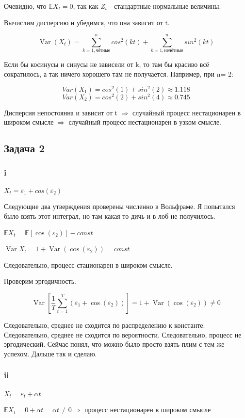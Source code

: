 \documentclass[a4paper,12pt]{article}
\def \e{\varepsilon}
\def \mbb{\mathbb}
\DeclareMathOperator{\Var}{Var}
\def \E{\mbb{E}}
\def \e{\varepsilon}
\begin{document}
Очевидно, что $  \E X_t = 0$, так как $ Z_t $ - стандартные нормальные величины.

Вычислим дисперсию и убедимся, что она зависит от t.

\[ \Var(X_t) = \sum_{k=1, \text{чётные}}^{n} cos^2(kt)  + \sum_{k=1, \text{нечётные}}^{n}  sin^2(kt) \]

Если бы косинусы и синусы не зависели от k, то там бы красиво всё сократилось, а так ничего хорошего там не получается. Например, при n= 2:

\[ Var(X_1) = cos^2(1) + sin^2(2) \approx 1.118\]
\[ Var(X_2) = cos^2(2) + sin^2(4) \approx 0.745\]

Дисперсия непостоянна и зависит от t $ \Rightarrow $ случайный процесс нестационарен в широком смысле $ \Rightarrow $ случайный процесс нестационарен в узком смысле.

\subsection{Задача 2}

\subsubsection{i}
$ X_t = \e_1 + cos(\e_2) $

Следующие два утверждения проверены численно в Вольфраме. Я попытался было взять этот интеграл, но там какая-то дичь и в лоб не получилось.

$ \E X_t = \E[\cos(\e_2)] - const $

$ \Var X_t = 1 + \Var(\cos(\e_2)) = const $

Следовательно, процесс стационарен в широком смысле. 

Проверим эргодичность.

\[ \Var[\frac{1}{T}\sum_{t = 1}^{T} (\e_1 + \cos(\e_2))]= 1 + \Var(\cos(\e_2)) \neq 0 \]

Следовательно, среднее не сходится по распределению к константе. Следовательно, среднее не сходится по вероятности. Следовательно, процесс не эргодический. Сейчас понял, что можно было просто взять плим с тем же успехом. Дальше так и сделаю.

\subsubsection{ii}

 $ X_t = \e_t + \alpha t $
 
 $ \E X_t = 0 + \alpha t = \alpha t \neq 0 \Rightarrow$ процесс нестационарен в широком смысле
 
\end{document}
